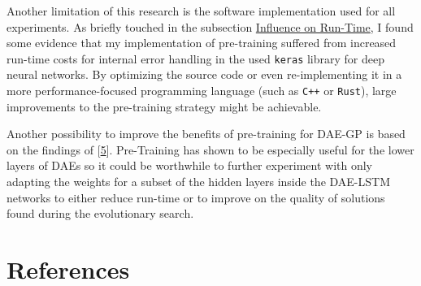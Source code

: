 \documentclass[
  11pt,
]{article}
\begin{document}
Another limitation of this research is the software implementation used for all experiments. As briefly touched in the subsection \protect\hyperlink{influence-on-run-time}{Influence on Run-Time}, I found some evidence that my implementation of pre-training suffered from increased run-time costs for internal error handling in the used \texttt{keras} library for deep neural networks. By optimizing the source code or even re-implementing it in a more performance-focused programming language (such as \texttt{C++} or \texttt{Rust}), large improvements to the pre-training strategy might be achievable.

Another possibility to improve the benefits of pre-training for DAE-GP is based on the findings of {[}\protect\hyperlink{ref-pmlr-v5-erhan09a}{5}{]}. Pre-Training has shown to be especially useful for the lower layers of DAEs so it could be worthwhile to further experiment with only adapting the weights for a subset of the hidden layers inside the DAE-LSTM networks to either reduce run-time or to improve on the quality of solutions found during the evolutionary search.

\newpage

\hypertarget{I}{%
\section*{References}\label{I}}
\end{document}
